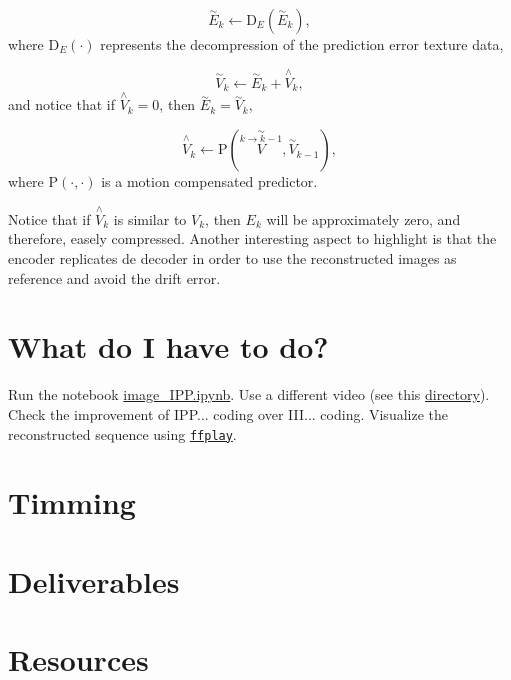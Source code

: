 \begin{equation}
  \overset{\sim}{E}_k \leftarrow \text{D}_{E}(\overset{\sim}{E}_k),
  \tag{h}
\end{equation}
where D$_{E}(\cdot)$ represents the decompression of the prediction
error texture data,

\begin{equation}
  \overset{\sim}{V}_k \leftarrow \overset{\sim}{E}_k + \overset{\wedge}{V}_k,
  \tag{i}
\end{equation}
and notice that if $\overset{\wedge}{V}_k=0$, then
$\overset{\sim}{E}_k = \overset{\sim}{V}_k$,

\begin{equation}
  \overset{\wedge}{V}_k \leftarrow \text{P}(\overset{\sim}{\overset{k\rightarrow k-1}{V}}, \overset{\sim}{V}_{k-1}),
  \tag{j}
\end{equation}
where P$(\cdot,\cdot)$ is a motion compensated predictor.

Notice that if $\overset{\wedge}{{V}}_k$ is similar to $V_k$, then
$E_k$ will be approximately zero, and therefore, easely
compressed. Another interesting aspect to highlight is that the
encoder replicates de decoder in order to use the reconstructed images
as reference and avoid the drift error.

\section{What do I have to do?}

Run the notebook \href{https://github.com/Sistemas-Multimedia/MRVC/blob/master/src/image_IPP.ipynb}{image\_IPP.ipynb}. Use a different video (see
this
\href{https://github.com/Sistemas-Multimedia/MRVC/tree/master/sequences}{directory}). Check
the improvement of IPP... coding over III... coding. Visualize the
reconstructed sequence using \href{https://ffmpeg.org/ffplay.html}{\texttt{ffplay}}.

\section{Timming}

\section{Deliverables}

\section{Resources}

\renewcommand{\addcontentsline}[3]{}%

